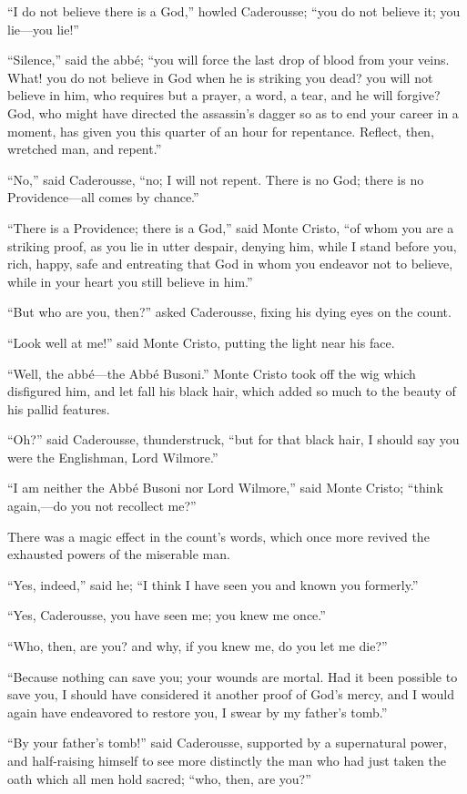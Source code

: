 “I do not believe there is a God,” howled Caderousse; “you do not
believe it; you lie—you lie!”

“Silence,” said the abbé; “you will force the last drop of blood from
your veins. What! you do not believe in God when he is striking you
dead? you will not believe in him, who requires but a prayer, a word, a
tear, and he will forgive? God, who might have directed the assassin’s
dagger so as to end your career in a moment, has given you this quarter
of an hour for repentance. Reflect, then, wretched man, and repent.”

“No,” said Caderousse, “no; I will not repent. There is no God; there
is no Providence—all comes by chance.”

“There is a Providence; there is a God,” said Monte Cristo, “of whom
you are a striking proof, as you lie in utter despair, denying him,
while I stand before you, rich, happy, safe and entreating that God in
whom you endeavor not to believe, while in your heart you still believe
in him.”

“But who are you, then?” asked Caderousse, fixing his dying eyes on the
count.

“Look well at me!” said Monte Cristo, putting the light near his face.

“Well, the abbé—the Abbé Busoni.” Monte Cristo took off the wig which
disfigured him, and let fall his black hair, which added so much to the
beauty of his pallid features.

“Oh?” said Caderousse, thunderstruck, “but for that black hair, I
should say you were the Englishman, Lord Wilmore.”

“I am neither the Abbé Busoni nor Lord Wilmore,” said Monte Cristo;
“think again,—do you not recollect me?”

There was a magic effect in the count’s words, which once more revived
the exhausted powers of the miserable man.

“Yes, indeed,” said he; “I think I have seen you and known you
formerly.”

“Yes, Caderousse, you have seen me; you knew me once.”

“Who, then, are you? and why, if you knew me, do you let me die?”

“Because nothing can save you; your wounds are mortal. Had it been
possible to save you, I should have considered it another proof of
God’s mercy, and I would again have endeavored to restore you, I swear
by my father’s tomb.”

“By your father’s tomb!” said Caderousse, supported by a supernatural
power, and half-raising himself to see more distinctly the man who had
just taken the oath which all men hold sacred; “who, then, are you?”

